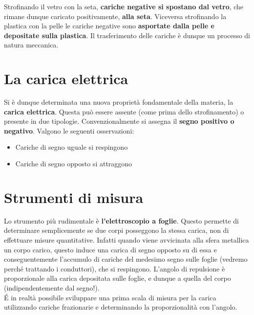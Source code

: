 Strofinando il vetro con la seta, \textbf{cariche negative si spostano dal vetro}, che rimane dunque caricato positivamente, \textbf{alla seta}. Viceversa strofinando la plastica con la pelle le cariche negative sono \textbf{asportate dalla pelle e depositate sulla plastica}. Il trasferimento delle cariche è dunque un processo di natura meccanica.

\section{La carica elettrica}
Si è dunque determinata una nuova proprietà fondamentale della materia, la \textbf{carica elettrica}. Questa può essere assente (come prima dello strofinamento) o presente in due tipologie. Convenzionalmente si assegna il \textbf{segno positivo o negativo}. Valgono le seguenti osservazioni:
\begin{itemize}
\item Cariche di segno uguale si respingono
\item Cariche di segno opposto si attraggono
\end{itemize}

\section{Strumenti di misura}
Lo strumento più rudimentale è \textbf{l'elettroscopio a foglie}. Questo permette di determinare semplicemente se due corpi posseggono la stessa carica, non di effettuare misure quantitative. Infatti quando viene avvicinata alla sfera metallica un corpo carico, questo induce una carica di segno opposto su di essa e conseguentemente l'accumulo di cariche del medesimo segno sulle foglie (vedremo perché trattando i conduttori), che si respingono. L'angolo di repulsione è proporzionale alla carica depositata sulle foglie, e dunque a quella del corpo (indipendentemente dal segno!).
\\\'E in realtà possibile sviluppare una prima scala di misura per la carica utilizzando cariche frazionarie e determinando la proporzionalità con l'angolo.

